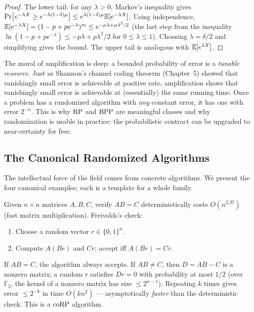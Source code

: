 \begin{proof}
The lower tail: for any $\lambda > 0$, Markov's inequality gives $\Pr[e^{-\lambda X} \ge e^{-\lambda (1-\delta)\mu}] \le e^{\lambda(1-\delta)\mu} \mathbb{E}[e^{-\lambda X}]$. Using independence, $\mathbb{E}[e^{-\lambda X}] = (1-p + pe^{-\lambda})^m \le e^{-\mu\lambda + \mu\lambda^2/2}$ (the last step from the inequality $\ln(1-p+pe^{-\lambda}) \le -p\lambda + p\lambda^2/2$ for $0\le \lambda \le 1$). Choosing $\lambda = \delta/2$ and simplifying gives the bound. The upper tail is analogous with $\mathbb{E}[e^{\lambda X}]$.
\end{proof}

The moral of amplification is deep: a bounded probability of error is a \emph{tunable resource}. Just as Shannon's channel coding theorem (Chapter~5) showed that vanishingly small error is achievable at positive rate, amplification shows that vanishingly small error is achievable at (essentially) the same running time. Once a problem has a randomized algorithm with \emph{any} constant error, it has one with error $2^{-n}$. This is why $\text{RP}$ and $\text{BPP}$ are meaningful classes and why randomization is usable in practice: the probabilistic contract can be upgraded to near-certainty for free.

\subsection{The Canonical Randomized Algorithms}
\label{sec:randomized:algorithms}

The intellectual force of the field comes from concrete algorithms. We present the four canonical examples; each is a template for a whole family.

\begin{example}
Given $n \times n$ matrices $A, B, C$, verify $AB = C$ deterministically costs $O(n^{2.37})$ (fast matrix multiplication). Freivalds's check:
\begin{enumerate}
\item Choose a random vector $r \in \{0,1\}^n$.
\item Compute $A(Br)$ and $Cr$; accept iff $A(Br) = Cr$.
\end{enumerate}
If $AB = C$, the algorithm always accepts. If $AB \neq C$, then $D = AB - C$ is a nonzero matrix; a random $r$ satisfies $Dr = 0$ with probability at most $1/2$ (over $\mathbb{F}_2$, the kernel of a nonzero matrix has size $\le 2^{n-1}$). Repeating $k$ times gives error $\le 2^{-k}$ in time $O(k n^2)$ --- asymptotically \emph{faster} than the deterministic check. This is a $\text{coRP}$ algorithm.
\end{example}

